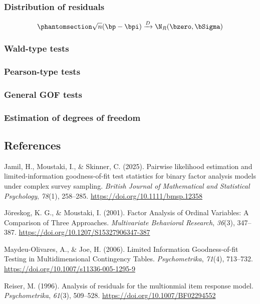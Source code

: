 \documentclass[
  letterpaper,
  DIV=11,
  numbers=noendperiod]{scrartcl}
\newlength{\cslhangindent}
\newenvironment{CSLReferences}[2] %
 {\begin{list}{}{%
  \setlength{\itemindent}{0pt}
  \setlength{\leftmargin}{0pt}
  \setlength{\parsep}{0pt}
  \ifodd #1
   \setlength{\leftmargin}{\cslhangindent}
   \setlength{\itemindent}{-1\cslhangindent}
  \fi
  \setlength{\itemsep}{#2\baselineskip}}}
 {\end{list}}
\begin{document}
\subsubsection{Distribution of
residuals}\label{distribution-of-residuals}

\begin{equation}\phantomsection\label{eq-clt-prop}{
\sqrt{n} (\bp - \bpi) \xrightarrow{D} {\N}_R(\bzero, \bSigma)
}\end{equation}

\subsubsection{Wald-type tests}\label{wald-type-tests}

\subsubsection{Pearson-type tests}\label{pearson-type-tests}

\subsubsection{General GOF tests}\label{general-gof-tests}

\subsubsection{Estimation of degrees of
freedom}\label{estimation-of-degrees-of-freedom}

\subsection*{References}\label{references}

\label{refs}
\begin{CSLReferences}{1}{0}
Jamil, H., Moustaki, I., \& Skinner, C. (2025). Pairwise likelihood
estimation and limited-information goodness-of-fit test statistics for
binary factor analysis models under complex survey sampling.
\emph{British Journal of Mathematical and Statistical Psychology},
\emph{78}(1), 258--285. \url{https://doi.org/10.1111/bmsp.12358}

Jöreskog, K. G., \& Moustaki, I. (2001). Factor {Analysis} of {Ordinal
Variables}: {A Comparison} of {Three Approaches}. \emph{Multivariate
Behavioral Research}, \emph{36}(3), 347--387.
\url{https://doi.org/10.1207/S15327906347-387}

Maydeu-Olivares, A., \& Joe, H. (2006). Limited {Information
Goodness-of-fit Testing} in {Multidimensional Contingency Tables}.
\emph{Psychometrika}, \emph{71}(4), 713--732.
\url{https://doi.org/10.1007/s11336-005-1295-9}

Reiser, M. (1996). Analysis of residuals for the multionmial item
response model. \emph{Psychometrika}, \emph{61}(3), 509--528.
\url{https://doi.org/10.1007/BF02294552}

\end{CSLReferences}
\end{document}
